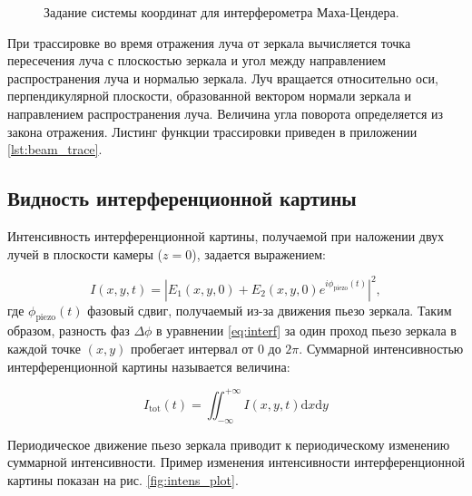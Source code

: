 \begin{figure}[ht]
\caption{Задание системы координат для интерферометра Маха-Цендера.}
\label{fig:MZI_coordis}
\end{figure}

При трассировке во время отражения луча от зеркала вычисляется точка пересечения луча с плоскостью зеркала и угол между направлением распространения луча и нормалью зеркала. Луч вращается относительно оси, перпендикулярной плоскости, образованной вектором нормали зеркала и  направлением распространения луча. Величина угла поворота определяется из закона отражения. Листинг функции трассировки приведен в приложении \ref{lst:beam_trace}.


\subsection{Видность интерференционной картины}\label{sec:ch2/sec1/subsec3}

Интенсивность интерференционной картины, получаемой при наложении двух лучей в плоскости камеры ($z=0$), задается выражением:

\begin{equation}
    I(x,y,t)=|E_1(x,y,0)+E_2(x,y,0)e^{i\phi_{\mathrm{piezo}}(t)}|^2,
\label{eq:I_def}
\end{equation}
где $\phi_{\mathrm{piezo}}(t)$ фазовый сдвиг, получаемый из-за движения пьезо зеркала. Таким образом, разность фаз $\Delta \phi$ в уравнении \eqref{eq:interf} за один проход пьезо зеркала в каждой точке $(x, y)$ пробегает интервал от $0$ до $2\pi$. Суммарной интенсивностью интерференционной картины называется величина: 

\begin{equation}
    I_{\mathrm{tot}}(t) = \iint_{-\infty}^{+\infty} I(x, y, t) {\mathrm{d}}x{\mathrm{d}}y
\end{equation}

Периодическое движение пьезо зеркала приводит к периодическому изменению суммарной интенсивности. Пример изменения интенсивности интерференционной картины показан на рис. \ref{fig:intens_plot}.

